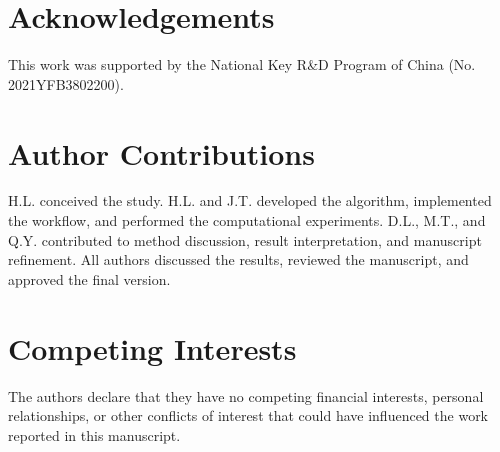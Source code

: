 \documentclass[pdflatex,sn-mathphys-num]{sn-jnl}
\theoremstyle{thmstyleone}%
\begin{document}
\section*{Acknowledgements}
This work was supported by the National Key R\&D Program of China (No. 2021YFB3802200).

\section*{Author Contributions}
H.L. conceived the study. H.L. and J.T. developed the algorithm, implemented the workflow, and performed the computational experiments. D.L., M.T., and Q.Y. contributed to method discussion, result interpretation, and manuscript refinement. All authors discussed the results, reviewed the manuscript, and approved the final version.


\section*{Competing Interests}
The authors declare that they have no competing financial interests, personal relationships, or other conflicts of interest that could have influenced the work reported in this manuscript.



\newpage
\clearpage


\end{document}
